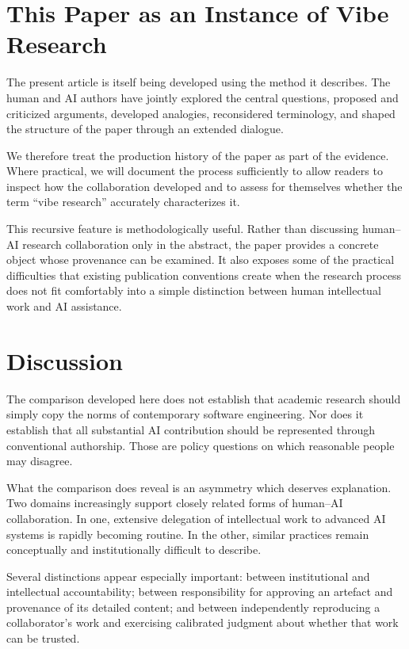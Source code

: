 \section{This Paper as an Instance of Vibe Research}

The present article is itself being developed using the method it describes. The human and AI authors have jointly explored the central questions, proposed and criticized arguments, developed analogies, reconsidered terminology, and shaped the structure of the paper through an extended dialogue.

We therefore treat the production history of the paper as part of the evidence. Where practical, we will document the process sufficiently to allow readers to inspect how the collaboration developed and to assess for themselves whether the term ``vibe research'' accurately characterizes it.

This recursive feature is methodologically useful. Rather than discussing human--AI research collaboration only in the abstract, the paper provides a concrete object whose provenance can be examined. It also exposes some of the practical difficulties that existing publication conventions create when the research process does not fit comfortably into a simple distinction between human intellectual work and AI assistance.


\section{Discussion}

The comparison developed here does not establish that academic research should simply copy the norms of contemporary software engineering. Nor does it establish that all substantial AI contribution should be represented through conventional authorship. Those are policy questions on which reasonable people may disagree.

What the comparison does reveal is an asymmetry which deserves explanation. Two domains increasingly support closely related forms of human--AI collaboration. In one, extensive delegation of intellectual work to advanced AI systems is rapidly becoming routine. In the other, similar practices remain conceptually and institutionally difficult to describe.

Several distinctions appear especially important: between institutional and intellectual accountability; between responsibility for approving an artefact and provenance of its detailed content; and between independently reproducing a collaborator's work and exercising calibrated judgment about whether that work can be trusted.

